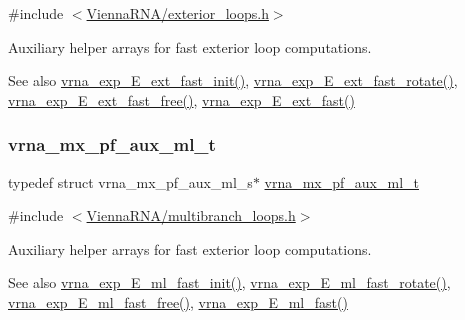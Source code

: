 {\ttfamily \#include $<$\mbox{\hyperlink{exterior__loops_8h}{Vienna\+R\+N\+A/exterior\+\_\+loops.\+h}}$>$}



Auxiliary helper arrays for fast exterior loop computations. 

\begin{DoxySeeAlso}{See also}
\mbox{\hyperlink{group__loops_ga3da479a5c627d50530d81f028c181731}{vrna\+\_\+exp\+\_\+\+E\+\_\+ext\+\_\+fast\+\_\+init()}}, \mbox{\hyperlink{group__loops_gabe4ed7e3d6152a3b9db4e4ed762aa1ba}{vrna\+\_\+exp\+\_\+\+E\+\_\+ext\+\_\+fast\+\_\+rotate()}}, \mbox{\hyperlink{group__loops_ga4357b7937f1b840f063e44b859332f98}{vrna\+\_\+exp\+\_\+\+E\+\_\+ext\+\_\+fast\+\_\+free()}}, \mbox{\hyperlink{group__loops_ga1c40acdc5e007f72d37a404127e9bcfb}{vrna\+\_\+exp\+\_\+\+E\+\_\+ext\+\_\+fast()}} 
\end{DoxySeeAlso}
\mbox{\label{group__loops_ga39a8cc1385dcb542a60a9393cde6a1e3}} 
\subsubsection{\texorpdfstring{vrna\+\_\+mx\+\_\+pf\+\_\+aux\+\_\+ml\+\_\+t}{vrna\_mx\_pf\_aux\_ml\_t}}
{\footnotesize\ttfamily typedef struct vrna\+\_\+mx\+\_\+pf\+\_\+aux\+\_\+ml\+\_\+s$\ast$ \mbox{\hyperlink{group__loops_ga39a8cc1385dcb542a60a9393cde6a1e3}{vrna\+\_\+mx\+\_\+pf\+\_\+aux\+\_\+ml\+\_\+t}}}



{\ttfamily \#include $<$\mbox{\hyperlink{multibranch__loops_8h}{Vienna\+R\+N\+A/multibranch\+\_\+loops.\+h}}$>$}



Auxiliary helper arrays for fast exterior loop computations. 

\begin{DoxySeeAlso}{See also}
\mbox{\hyperlink{group__loops_gace7640e156900ba8b01edc1a7136b2b7}{vrna\+\_\+exp\+\_\+\+E\+\_\+ml\+\_\+fast\+\_\+init()}}, \mbox{\hyperlink{group__loops_gabc73c029027ba09bfe70e2318052f0ae}{vrna\+\_\+exp\+\_\+\+E\+\_\+ml\+\_\+fast\+\_\+rotate()}}, \mbox{\hyperlink{group__loops_ga3bbc24b3950867b039104ce8b4f39346}{vrna\+\_\+exp\+\_\+\+E\+\_\+ml\+\_\+fast\+\_\+free()}}, \mbox{\hyperlink{group__loops_ga567d730fc5389b94d6ee545e42412d6c}{vrna\+\_\+exp\+\_\+\+E\+\_\+ml\+\_\+fast()}} 
\end{DoxySeeAlso}


